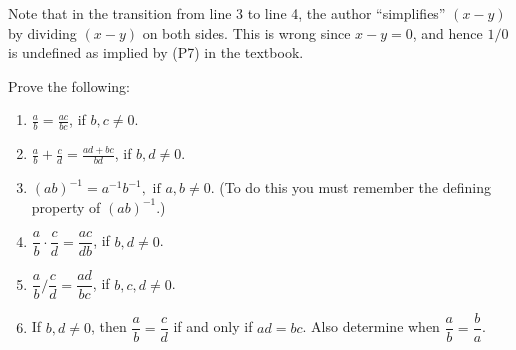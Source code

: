 \begin{solution}
  Note that in the transition from line 3 to line 4,
  the author ``simplifies'' $(x-y)$ by
  dividing $(x-y)$ on both sides. This is wrong since $x-y=0$,
  and hence $1/0$ is undefined as implied by (P7)
  in the textbook.
\end{solution}

\begin{pr}
  Prove the following:
  \begin{enumerate}[label=(\roman*)]
    \item $\displaystyle{\frac{a}{b} = \frac{ac}{bc}}$,
    if $b,c\neq0$.
    \item
      $\displaystyle{\frac{a}{b}+\frac{c}{d}=\frac{ad+bc}{bd}}$,
    if $b,d\neq0$.
    \item
    $(ab)^{-1}=a^{-1}b^{-1},\text{ if }a,b\neq0$. (To do this
    you must remember the defining property of $(ab)^{-1}$.)
    \item
    $\dfrac{a}{b}\cdot\dfrac{c}{d}=\dfrac{ac}{db}$, if
    $b,d\neq0$.
    \item
    $\dfrac{a}{b}\Bigg/\dfrac{c}{d}=\dfrac{ad}{bc}$, if
    $b,c,d\neq0$.
    \item
    If $b,d\neq0$, then $\dfrac{a}{b}=\dfrac{c}{d}$ if and
    only if $ad=bc$. Also determine when $\dfrac{a}{b}=
    \dfrac{b}{a}$.
  \end{enumerate}
\end{pr}

